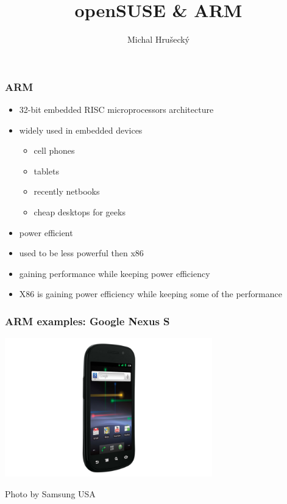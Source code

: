 \documentclass{beamer}
\author{Michal Hru\v{s}eck\'{y}\newline {\small openSUSE Boosters}}
\title{openSUSE \& ARM}
\begin{document}
\begin{frame}[t,plain]
\titlepage
\end{frame}


\begin{frame}[t]
\frametitle{ARM}
\begin{itemize}
   \item 32-bit embedded RISC microprocessors architecture
   \item widely used in embedded devices
   \begin{itemize}
   	\item cell phones
	\item tablets
	\item recently netbooks
	\item cheap desktops for geeks
   \end{itemize}
   \item power efficient
   \item used to be less powerful then x86
   \item gaining performance while keeping power efficiency
   \item X86 is gaining power efficiency while keeping some of the performance
\end{itemize}
\end{frame}

\begin{frame}[t]
\frametitle{ARM examples: Google Nexus S}
\begin{center}
\includegraphics[height=6cm]{Nexuss.jpg}

{\scriptsize Photo by Samsung USA}
\end{center}
\end{frame}
\end{document}
